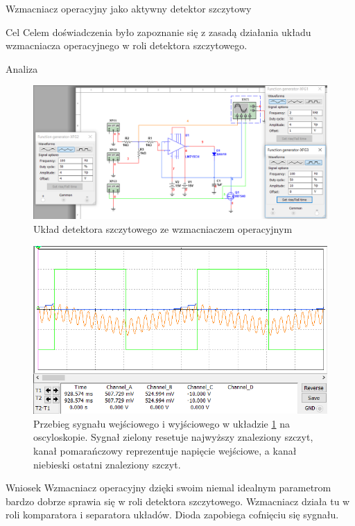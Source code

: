 \documentclass[a4paper]{scrartcl}
\begin{document}
	\begin{section}{Wzmacniacz operacyjny jako aktywny detektor szczytowy}
		\begin{subsection}{Cel}
			Celem doświadczenia było zapoznanie się z zasadą działania układu wzmacniacza operacyjnego w roli detektora szczytowego.
		\end{subsection}
		\begin{subsection}{Analiza}
				\begin{figure}[ht]
				\begin{center}
					\includegraphics[width=\linewidth]{08-circuit-2}
					\caption{Układ detektora szczytowego ze wzmacniaczem operacyjnym}
					\label{fig:circuit-8}
				\end{center}
				\end{figure}
				\begin{figure}[!ht]
				\begin{center}
					\includegraphics[width=0.6\linewidth]{08-osc-2}
					\caption{Przebieg sygnału wejściowego i wyjściowego w układzie \ref{fig:circuit-8} na oscyloskopie. Sygnał zielony resetuje najwyższy znaleziony szczyt, kanał pomarańczowy reprezentuje napięcie wejściowe, a kanał niebieski ostatni znaleziony szczyt.}
				\end{center}
				\end{figure}
		\end{subsection}
		\begin{subsection}{Wniosek}
			Wzmacniacz operacyjny dzięki swoim niemal idealnym parametrom bardzo dobrze sprawia się w roli detektora szczytowego. Wzmacniacz działa tu w roli komparatora i separatora układów. Dioda zapobiega cofnięciu się sygnału.	
		\end{subsection}
	\end{section}
\end{document}
